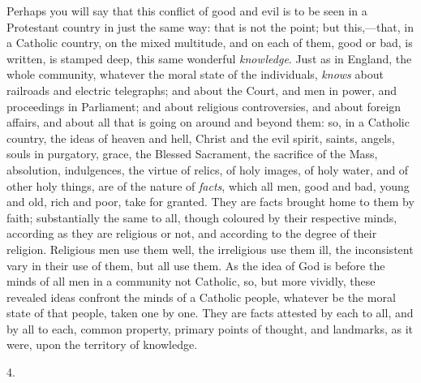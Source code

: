Perhaps you will say that this conflict of good and evil is to be
seen in a Protestant country in just the same way: that is not the
point; but this,—that, in a Catholic country, on the mixed multitude,
and on each of them, good or bad, is written, is stamped deep, this
same wonderful \emph{knowledge}. Just as in England, the whole
community, whatever the moral state of the individuals, \emph{knows}
about railroads and electric telegraphs; and about the Court, and men
in power, and proceedings in Parliament; and about religious
controversies, and about foreign affairs, and about all that is going
on around and beyond them: so, in a Catholic country, the ideas of
heaven and hell, Christ and the evil spirit, saints, angels, souls in
purgatory, grace, the Blessed Sacrament, the sacrifice of the Mass,
absolution, indulgences, the virtue of relics, of holy images, of holy
water, and of other holy things, are of the nature of \emph{facts},
which all men, good and bad, young and old, rich and poor, take for
granted. They are facts brought home to them by faith; substantially
the same to all, though coloured by their respective minds, according
as they are religious or not, and according to the degree of their
religion. Religious men use them well, the irreligious use them ill,
the inconsistent vary in their use of them, but all use them. As the
idea of God is before the minds of all men in a community not
Catholic, so, but more vividly, these revealed ideas confront the
minds of a Catholic people, whatever be the moral state of that
people, taken one by one. They are facts attested by each to all, and
by all to each, common property, primary points of thought, and
landmarks, as it were, upon the territory of knowledge.

4.

